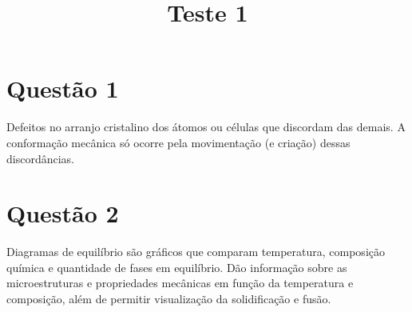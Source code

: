 \documentclass[a4paper]{report}
\title{Teste 1}
\begin{document}
\section*{Questão 1}

Defeitos no arranjo cristalino dos átomos ou células que discordam das demais. A conformação mecânica só ocorre pela movimentação (e criação) dessas discordâncias.

\section*{Questão 2}

Diagramas de equilíbrio são gráficos que comparam temperatura, composição química e quantidade de fases em equilíbrio. Dão informação sobre as microestruturas e propriedades mecânicas em função da temperatura e composição, além de permitir visualização da solidificação e fusão.
\end{document}

